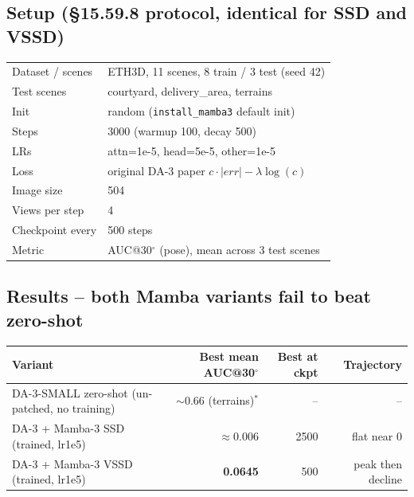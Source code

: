 \documentclass[11pt,a4paper]{article}
\begin{document}
\subsection{Setup (\S15.59.8 protocol, identical for SSD and VSSD)}

\begin{center}
\begin{tabular}{ll}
\toprule
Dataset / scenes      & ETH3D, 11 scenes, 8 train / 3 test (seed 42) \\
Test scenes           & courtyard, delivery\_area, terrains \\
Init                  & random (\texttt{install\_mamba3} default init) \\
Steps                 & 3000 (warmup 100, decay 500) \\
LRs                   & attn=1e-5, head=5e-5, other=1e-5 \\
Loss                  & original DA-3 paper $c\cdot|err| - \lambda\log(c)$ \\
Image size            & 504 \\
Views per step        & 4 \\
Checkpoint every      & 500 steps \\
Metric                & AUC@30$^\circ$ (pose), mean across 3 test scenes \\
\bottomrule
\end{tabular}
\end{center}

\subsection{Results -- both Mamba variants fail to beat zero-shot}

\begin{center}
\begin{tabular}{lrrr}
\toprule
Variant                                  & Best mean AUC@30$^\circ$ & Best at ckpt & Trajectory   \\
\midrule
DA-3-SMALL zero-shot (un-patched, no training) & $\sim 0.66$ (terrains)$^*$ & --        & --           \\
DA-3 + Mamba-3 SSD (trained, lr1e5)      & $\approx 0.006$           & 2500         & flat near 0  \\
DA-3 + Mamba-3 VSSD (trained, lr1e5)     & \textbf{0.0645}           & 500          & peak then decline \\
\bottomrule
\end{tabular}
\end{center}
\end{document}
